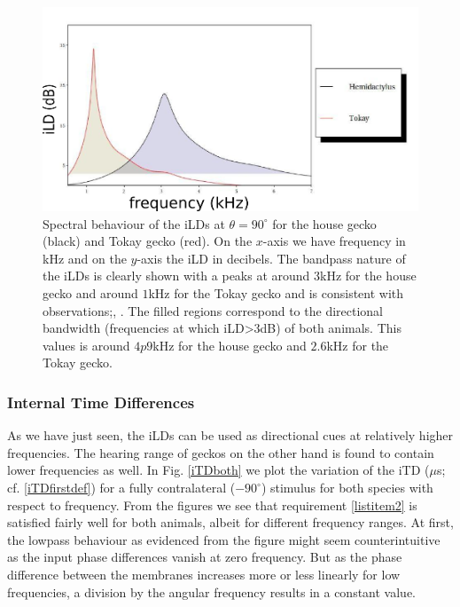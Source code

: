 \begin{figure}[ht!]
\centering
  \includegraphics[width=.6\linewidth]{Diagrams/Plots/iLD/iLDspectrumboth2.png}
  \caption[Spectral behavior of the iLDs.]{Spectral behaviour of the iLDs at $\theta=90^\circ$ for the house gecko (black) and Tokay gecko (red). On the $x$-axis we have frequency in kHz and on the $y$-axis the iLD in decibels.
  The bandpass nature of the iLDs is clearly shown with a peaks at around $3$kHz for the house gecko and around $1$kHz for the Tokay gecko and is consistent with observations;\cite{dalsgaardmanley1}, \cite{dalsgaardmanley2}. The
  filled regions correspond to the directional bandwidth (frequencies at which iLD>3dB) of both animals. This values is around $4p9$kHz for the house gecko and $2.6$kHz
  for the Tokay gecko.}
  \label{iLDspectrum}
\end{figure}

\subsubsection{Internal Time Differences}
As we have just seen, the iLDs can be used as directional cues at relatively higher frequencies. The hearing range of geckos
on the other hand is found to contain lower frequencies as well. In Fig. \ref{iTDboth} we plot the variation of the iTD ($\mu$s; cf. \eqref{iTDfirstdef}) for 
a fully contralateral ($-90^\circ$) stimulus for both species with respect to frequency. From the figures we see that requirement \ref{listitem2} is satisfied fairly
well for both animals, albeit for different frequency ranges. At first, the lowpass behaviour as evidenced from the figure might seem counterintuitive as the
input phase differences vanish at zero frequency. But as the phase difference between the membranes increases more or less linearly for low frequencies,
a division by the angular frequency results in a constant value.

